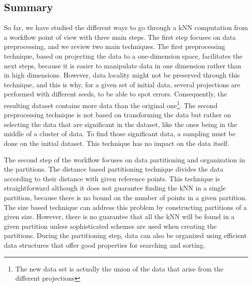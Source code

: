 \subsection{Summary}
So far, we have studied the different ways to go through a kNN computation from a workflow point of view with three main steps.
The first step focuses on data preprocessing, and we review two main techniques. 
The first preprocessing technique, based on projecting the data to a one-dimension space, facilitates the next steps, because it is easier to manipulate 
data in one dimension rather than in high dimensions. 
However, data locality might not be preserved through this technique, and this is why, for a given set of initial data, several projections are performed 
with different seeds, to be able to spot errors. Consequently, the resulting dataset contains more data than the original one\footnote{The new data set is actually
the union of the data that arise from the different projections}.
The second preprocessing technique is not based on transforming the data but rather on selecting the data that are significant in the dataset, like the ones being in the middle of a cluster of data. To find those significant data, a sampling must be done on the initial dataset. This technique has no impact on the data itself.

The second step of the workflow focuses on data partitioning and organization in the partitions. 
The distance based partitioning technique divides the data according to their distance with given reference points.
This technique is straightforward although it does not guarantee finding the kNN in a single partition, because there is no bound on  the 
number of points in a given partition. 
The size based technique can address this problem by constructing partitions of a given size. However, there is no guarantee that all the kNN will be found in a given partition unless sophisticated schemes are used when creating the partitions.
During the partitioning step, data can also be organized using efficient data structures that offer good properties for searching and sorting.


